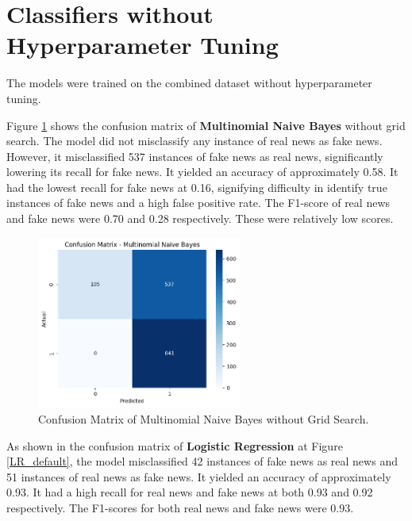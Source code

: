 \section{Classifiers without Hyperparameter Tuning}

The models were trained on the combined dataset without hyperparameter tuning.

Figure \ref{MNB_default} shows the confusion matrix of \textbf{Multinomial Naive Bayes} without grid search. The model did not misclassify any instance of real news as fake news. However, it misclassified 537 instances of fake news as real news, significantly lowering its recall for fake news. It yielded an accuracy of approximately 0.58. It had the lowest recall for fake news at 0.16, signifying difficulty in identify true instances of fake news and a high false positive rate. The F1-score of real news and fake news were 0.70 and 0.28 respectively. These were relatively low scores. 

\begin{figure}[h!]
    \centering
    \includegraphics[width=0.6\textwidth,height=0.6\textheight, keepaspectratio]{figures/hyperparam/MNB_default.png}
        \caption{Confusion Matrix of Multinomial Naive Bayes without Grid Search.}
        \label{MNB_default}
\end{figure}

As shown in the confusion matrix of \textbf{Logistic Regression} at Figure \ref{LR_default}, the model misclassified 42 instances of fake news as real news and 51 instances of real news as fake news. It yielded an accuracy of approximately 0.93. It had a high recall for real news and fake news at both 0.93 and 0.92 respectively. The F1-scores for both real news and fake news were 0.93.

